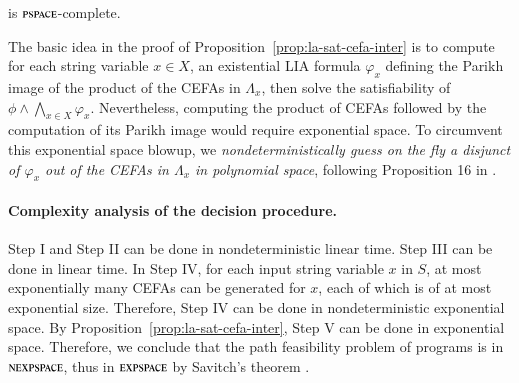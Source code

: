 \begin{proposition}\label{prop:la-sat-cefa-inter}
{\lasat} is $\textsc{pspace}$-complete.
\end{proposition}

The basic idea in the proof of Proposition~\ref{prop:la-sat-cefa-inter} is to compute for each string variable $x \in X$, an existential LIA formula $\varphi_x$ defining the Parikh image of the product of the CEFAs in $\Lambda_x$, then solve the satisfiability of $\phi \wedge \bigwedge_{x \in X} \varphi_x$. Nevertheless, computing the product of CEFAs followed by the computation of its Parikh image would require exponential space. To circumvent this exponential space blowup, %
we \emph{nondeterministically guess on the fly a disjunct of $\varphi_x$ out of the CEFAs in $\Lambda_x$ in polynomial space}, %
following Proposition 16 in \cite{LB16}. 


\paragraph*{Complexity analysis of the decision procedure.} Step I and Step II can be done in nondeterministic linear time. Step III can be done in linear time. %
In Step IV, for each input string variable $x$ in $S$, at most exponentially many CEFAs can be generated for $x$, each of which is of at most exponential size. Therefore, Step IV can be done in nondeterministic exponential space. By Proposition~\ref{prop:la-sat-cefa-inter}, Step V can be done in exponential space. Therefore, we conclude that the path feasibility problem of {\slint} programs is in $\textsc{nexpspace}$, thus in $\textsc{expspace}$ by Savitch's theorem \cite{complexity-book}. %

